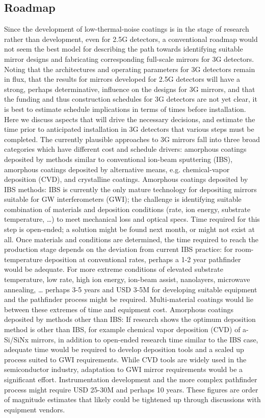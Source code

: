\subsection{Roadmap}
Since the development of low-thermal-noise coatings is in the stage of research rather than development, even for 2.5G detectors, a conventional roadmap would not seem the best model for describing the path towards identifying suitable mirror designs and fabricating corresponding full-scale mirrors for 3G detectors. Noting that the architectures and operating parameters for 3G detectors remain in flux, that the results for mirrors developed for 2.5G detectors will have a strong, perhaps determinative, influence on the designs for 3G mirrors, and that the funding and thus construction schedules for 3G detectors are not yet clear, it is best to estimate schedule implications in terms of times before installation. Here we discuss aspects that will drive the necessary decisions, and estimate the time prior to anticipated installation in 3G detectors that various steps must be completed. 
The currently plausible approaches to 3G mirrors fall into three broad categories which have different cost and schedule drivers: amorphous coatings deposited by methods similar to conventional ion-beam sputtering (IBS), amorphous coatings deposited by alternative means, e.g. chemical-vapor deposition (CVD), and crystalline coatings. 
Amorphous coatings deposited by IBS methods: IBS is currently the only mature technology for depositing mirrors suitable for GW interferometers (GWI); the challenge is identifying suitable combination of materials and deposition conditions (rate, ion energy, substrate temperature, …) to meet mechanical loss and optical specs. Time required for this step is open-ended; a solution might be found next month, or might not exist at all. Once materials and conditions are determined, the time required to reach the production stage depends on the deviation from current IBS practice: for room-temperature deposition at conventional rates, perhaps a 1-2 year pathfinder would be adequate. For more extreme conditions of elevated substrate temperature, low rate, high ion energy, ion-beam assist, nanolayers, microwave annealing, … perhaps 3-5 years and USD 3-5M for developing suitable equipment and the pathfinder process might be required. Multi-material coatings would lie between these extremes of time and equipment cost. 
Amorphous coatings deposited by methods other than IBS: If research shows the optimum  deposition method is other than IBS, for example chemical vapor deposition (CVD) of a-Si/SiNx mirrors, in addition to open-ended research time similar to the IBS case, adequate time would be required to develop deposition tools and a scaled up process suited to GWI requirements. While CVD tools are widely used in the semiconductor industry, adaptation to GWI mirror requirements would be a significant effort. Instrumentation development and the more complex pathfinder process might require  USD 25-30M and perhaps 10 years. These figures are order of magnitude estimates that likely could be tightened up through discussions with equipment vendors. 

